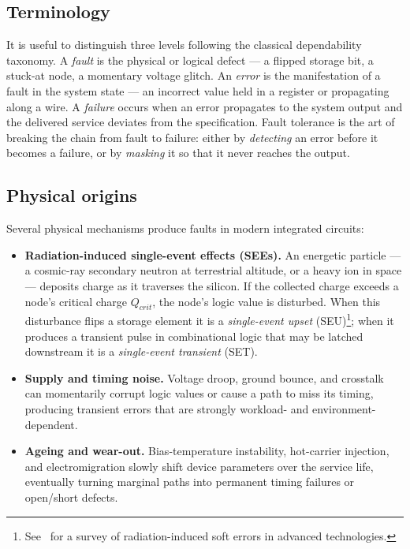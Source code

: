 \subsection{Terminology}

It is useful to distinguish three levels following the classical dependability~\cite{avizienis}
taxonomy. A \emph{fault} is the physical or logical defect --- a flipped storage
bit, a stuck-at node, a momentary voltage glitch. An \emph{error} is the
manifestation of a fault in the system state --- an incorrect value held in a
register or propagating along a wire. A \emph{failure} occurs when an error
propagates to the system output and the delivered service deviates from the
specification. Fault tolerance is the art of breaking the chain from fault to
failure: either by \emph{detecting} an error before it becomes a failure, or by
\emph{masking} it so that it never reaches the output.

\subsection{Physical origins}

Several physical mechanisms produce faults in modern integrated circuits:

\begin{itemize}
  \item \textbf{Radiation-induced single-event effects (SEEs).} An energetic
        particle --- a cosmic-ray secondary neutron at terrestrial altitude, or
        a heavy ion in space --- deposits charge as it traverses the silicon. If
        the collected charge exceeds a node's critical charge $Q_{crit}$, the
        node's logic value is disturbed. When this disturbance flips a storage
        element it is a \emph{single-event upset} (SEU)\footnote{See~\cite{baumann} for a survey of radiation-induced soft errors in advanced technologies.}; when it produces a
        transient pulse in combinational logic that may be latched downstream it
        is a \emph{single-event transient} (SET).
  \item \textbf{Supply and timing noise.} Voltage droop, ground bounce, and
        crosstalk can momentarily corrupt logic values or cause a path to miss
        its timing, producing transient errors that are strongly workload- and
        environment-dependent.
  \item \textbf{Ageing and wear-out.} Bias-temperature instability,
        hot-carrier injection, and electromigration slowly shift device
        parameters over the service life, eventually turning marginal paths into
        permanent timing failures or open/short defects.
\end{itemize}

